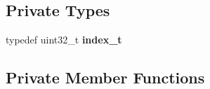 \subsection*{Private Types}
\begin{DoxyCompactItemize}
\item 
typedef uint32\+\_\+t {\bfseries index\+\_\+t}\hypertarget{classv8_1_1internal_1_1interpreter_1_1_b_a_s_e___e_m_b_e_d_d_e_d_ab6c59e5d92b0240f587a015861e7c642}{}\label{classv8_1_1internal_1_1interpreter_1_1_b_a_s_e___e_m_b_e_d_d_e_d_ab6c59e5d92b0240f587a015861e7c642}

\end{DoxyCompactItemize}
\subsection*{Private Member Functions}
